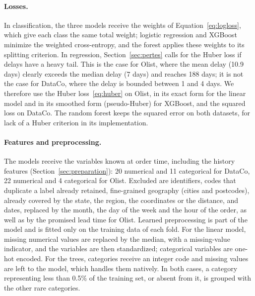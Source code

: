 \documentclass[11pt,a4paper]{article}
\theoremstyle{definition}
\begin{document}
\paragraph{Losses.} In classification, the three models receive the weights of Equation~\eqref{eq:logloss}, which give each class the same total weight; logistic regression and XGBoost minimize the weighted cross-entropy, and the forest applies these weights to its splitting criterion. In regression, Section~\ref{sec:pertes} calls for the Huber loss if delays have a heavy tail. This is the case for Olist, where the mean delay (10.9 days) clearly exceeds the median delay (7 days) and reaches 188 days; it is not the case for DataCo, where the delay is bounded between 1 and 4 days. We therefore use the Huber loss~\eqref{eq:huber} on Olist, in its exact form for the linear model and in its smoothed form (pseudo-Huber) for XGBoost, and the squared loss on DataCo. The random forest keeps the squared error on both datasets, for lack of a Huber criterion in its implementation.

\paragraph{Features and preprocessing.} The models receive the variables known at order time, including the history features (Section~\ref{sec:preparation}): 20 numerical and 11 categorical for DataCo, 22 numerical and 4 categorical for Olist. Excluded are identifiers, codes that duplicate a label already retained, fine-grained geography (cities and postcodes), already covered by the state, the region, the coordinates or the distance, and dates, replaced by the month, the day of the week and the hour of the order, as well as by the promised lead time for Olist. Learned preprocessing is part of the model and is fitted only on the training data of each fold. For the linear model, missing numerical values are replaced by the median, with a missing-value indicator, and the variables are then standardized; categorical variables are one-hot encoded. For the trees, categories receive an integer code and missing values are left to the model, which handles them natively. In both cases, a category representing less than 0.5\% of the training set, or absent from it, is grouped with the other rare categories.
\end{document}
